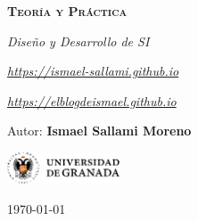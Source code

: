 \documentclass[12pt]{report} %
\begin{document}
\begin{titlepage}
    \begin{center}
        \vspace*{2cm}
        
        {\Huge \bfseries\scshape Teoría y Práctica \par}
        \vspace{0.5cm}
        {\Large \itshape Diseño y Desarrollo de SI \par}
        \vspace{0.5cm}
        {\small \itshape \href{https://ismael-sallami.github.io}{https://ismael-sallami.github.io} \par}
        {\small \itshape \href{https://elblogdeismael.github.io}{https://elblogdeismael.github.io} \par}


        \vfill
        
        {\LARGE Autor: \textbf{Ismael Sallami Moreno} \par}
        \vspace{0.3cm}
        
        \vspace{1cm}
        \includegraphics[width=0.25\textwidth]{../../../extraFiles/img/ugr.png} %
        \vspace{1cm}
        
        {\large \today}
    \end{center}
    
    \restoregeometry
\end{titlepage}


\thispagestyle{empty} %
\clearpage

\tableofcontents
\listoffigures
\clearpage

\listoftables
\clearpage
\thispagestyle{empty} %
\clearpage

\renewcommand{\lstlistlistingname}{Índice de Código}
\lstlistoflistings
\clearpage

\renewcommand{\listtheoremname}{Índice de Ecuaciones}
\listoftheorems[ignoreall,show={equation}]
\clearpage
\end{document}

